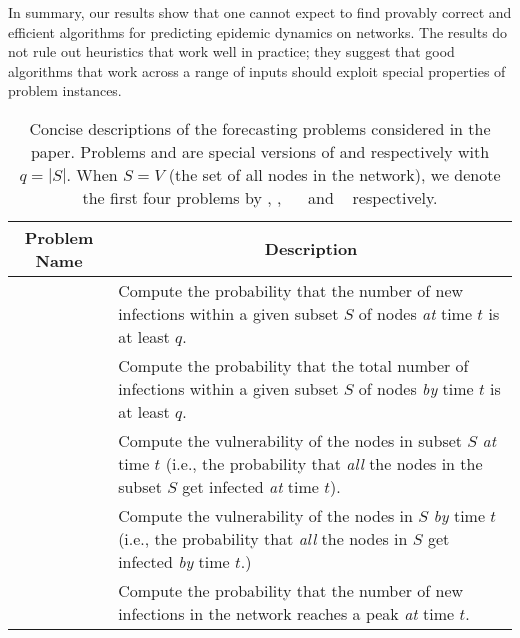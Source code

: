 \smallskip
In summary, our results show that one cannot expect to find
provably correct and efficient algorithms for predicting 
epidemic dynamics on networks.  
The results do not rule out heuristics that work well in practice;
they suggest that good algorithms that work across a range of inputs 
should exploit special properties of problem instances.


\begin{table}[tbh]
\bigskip
\begin{center}
\begin{tabular}{|p{1.6in}|p{3.9in}|} \hline
\multicolumn{1}{|c|}{\textbf{Problem Name}} &
\multicolumn{1}{|c|}{\textbf{Description}} \\ \hline\hline
\tNewInfs{} & {Compute the probability that the number of new infections
              within a given subset $S$ of nodes \emph{at} time $t$
           is at least $q$.} \\ \hline
\tTotInfs{} & {Compute the probability that the total number of
              infections within a given subset $S$ of nodes \emph{by} time $t$ is
              at least $q$.} \\ \hline
\tVuls{} & {Compute the vulnerability of the nodes in subset $S$ \emph{at}
            time $t$ (i.e., the probability that \emph{all} the nodes
                         in the subset $S$ get infected
                         \emph{at} time $t$).} \\ \hline
\tTotVuls{}   & {Compute the vulnerability of the nodes
                             in $S$ \emph{by} time $t$
                 (i.e., the probability that \emph{all} the nodes in $S$ get infected
                             \emph{by} time $t$.)} \\ \hline
\tPeak{}   & {Compute the probability that the number of new infections in
              the network reaches a peak \emph{at} time $t$.} \\ \hline\hline
\end{tabular}
\end{center}
\caption{Concise descriptions of the forecasting
problems considered in the paper.
Problems \tVuls{} and \tTotVuls{} are special versions 
of \tNewInfs{} and \tTotInfs{} respectively with $q = |S|$.
When $S = V$ (the set of all nodes in the network), we denote
the first four problems by \tNewInfv, \tTotInfv,~ \tVulv{}~ and \tTotVulv{}~
respectively.
}
\label{init:tab:prob_def}
\end{table}


